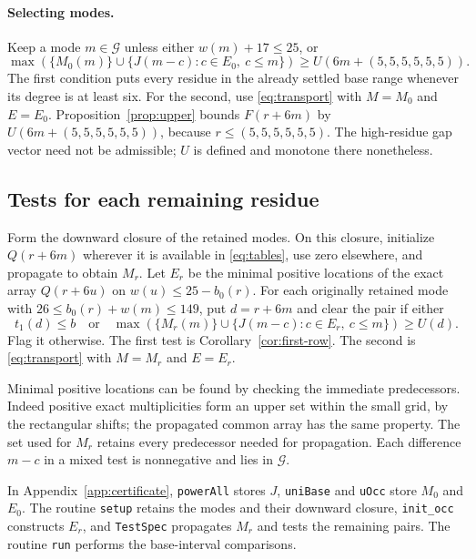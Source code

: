 \paragraph{Selecting modes.}
Keep a mode \(m\in\mathcal G\) unless either \(w(m)+17\le25\), or
\begin{equation}\label{eq:sharedtest}
 \max\left(\{M_0(m)\}\cup
       \{J(m-c):c\in E_0,\ c\le m\}\right)
                   \ge U(6m+(5,5,5,5,5,5)).
\end{equation}
The first condition puts every residue in the already settled base
range whenever its degree is at least six. For the second, use
\eqref{eq:transport} with \(M=M_0\) and \(E=E_0\).
Proposition~\ref{prop:upper} bounds \(F(r+6m)\) by
\(U(6m+(5,5,5,5,5,5))\), because \(r\le(5,5,5,5,5,5)\).
The high-residue gap vector need not be admissible; \(U\) is defined and
monotone there nonetheless.

\subsection{Tests for each remaining residue}
Form the downward closure of the retained modes. On this closure,
initialize \(Q(r+6m)\) wherever it is available in
\eqref{eq:tables}, use zero elsewhere, and propagate to obtain \(M_r\).
Let \(E_r\) be the minimal positive locations of the exact array
\(Q(r+6u)\) on \(w(u)\le25-b_0(r)\).
For each originally retained mode with \(26\le b_0(r)+w(m)\le149\),
put \(d=r+6m\) and clear the pair if either
\[
 t_1(d)\le b
 \quad\text{or}\quad
 \max\left(\{M_r(m)\}\cup
          \{J(m-c):c\in E_r,\ c\le m\}\right)\ge U(d).
\]
Flag it otherwise. The first test is Corollary~\ref{cor:first-row}.
The second is \eqref{eq:transport} with \(M=M_r\) and \(E=E_r\).

Minimal positive locations can be found by checking the immediate
predecessors. Indeed positive exact multiplicities form an upper set
within the small grid, by the rectangular shifts; the propagated common
array has the same property. The set used for \(M_r\) retains every
predecessor needed for propagation. Each difference \(m-c\) in a mixed
test is nonnegative and lies in \(\mathcal G\).

In Appendix~\ref{app:certificate}, \texttt{powerAll} stores \(J\),
\texttt{uniBase} and \texttt{uOcc} store \(M_0\) and \(E_0\).
The routine \texttt{setup} retains the modes and their downward closure,
\texttt{init\_occ} constructs \(E_r\), and \texttt{TestSpec} propagates
\(M_r\) and tests the remaining pairs. The routine \texttt{run} performs
the base-interval comparisons.


